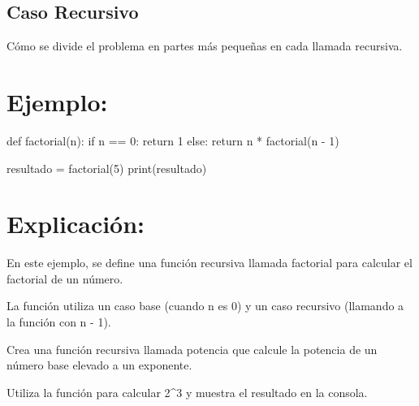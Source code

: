 \documentclass[
  a4paper,
  onepage,
  openany]{scrreprt}
\newenvironment{Shaded}{\begin{snugshade}}{\end{snugshade}}
\newcommand{\BuiltInTok}[1]{\textcolor[rgb]{0.00,0.23,0.31}{#1}}
\newcommand{\ControlFlowTok}[1]{\textcolor[rgb]{0.00,0.23,0.31}{#1}}
\newcommand{\DecValTok}[1]{\textcolor[rgb]{0.68,0.00,0.00}{#1}}
\newcommand{\KeywordTok}[1]{\textcolor[rgb]{0.00,0.23,0.31}{#1}}
\newcommand{\NormalTok}[1]{\textcolor[rgb]{0.00,0.23,0.31}{#1}}
\newcommand{\OperatorTok}[1]{\textcolor[rgb]{0.37,0.37,0.37}{#1}}
\begin{document}
\hypertarget{caso-recursivo-1}{%
\subsection{Caso Recursivo}\label{caso-recursivo-1}}

Cómo se divide el problema en partes más pequeñas en cada llamada
recursiva.

\hypertarget{ejemplo-47}{%
\section{Ejemplo:}\label{ejemplo-47}}

\begin{Shaded}
\begin{Highlighting}[]
\KeywordTok{def}\NormalTok{ factorial(n):}
    \ControlFlowTok{if}\NormalTok{ n }\OperatorTok{==} \DecValTok{0}\NormalTok{:}
        \ControlFlowTok{return} \DecValTok{1}
    \ControlFlowTok{else}\NormalTok{:}
        \ControlFlowTok{return}\NormalTok{ n }\OperatorTok{*}\NormalTok{ factorial(n }\OperatorTok{{-}} \DecValTok{1}\NormalTok{)}

\NormalTok{resultado }\OperatorTok{=}\NormalTok{ factorial(}\DecValTok{5}\NormalTok{)}
\BuiltInTok{print}\NormalTok{(resultado)}
\end{Highlighting}
\end{Shaded}

\hypertarget{explicaciuxf3n-47}{%
\section{Explicación:}\label{explicaciuxf3n-47}}

En este ejemplo, se define una función recursiva llamada factorial para
calcular el factorial de un número.

La función utiliza un caso base (cuando n es 0) y un caso recursivo
(llamando a la función con n - 1).

\begin{tcolorbox}[enhanced jigsaw, breakable, opacityback=0, toptitle=1mm, coltitle=black, toprule=.15mm, rightrule=.15mm, colframe=quarto-callout-important-color-frame, opacitybacktitle=0.6, arc=.35mm, title=\textcolor{quarto-callout-important-color}{\faExclamation}\hspace{0.5em}{Actividad Práctica:}, titlerule=0mm, colbacktitle=quarto-callout-important-color!10!white, bottomtitle=1mm, bottomrule=.15mm, colback=white, left=2mm, leftrule=.75mm]

Crea una función recursiva llamada potencia que calcule la potencia de
un número base elevado a un exponente.

Utiliza la función para calcular 2\^{}3 y muestra el resultado en la
consola.

\end{tcolorbox}
\end{document}
